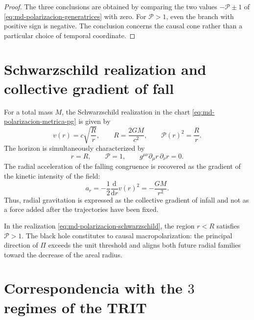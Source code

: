 \begin{proof}
The three conclusions are obtained by comparing the two values
\(-\mathcal P\pm1\) of \eqref{eq:md-polarizacion-generatrices} with zero. For
\(\mathcal P>1\), even the branch with positive sign is negative. The
conclusion concerns the causal cone rather than a particular choice of
temporal coordinate.
\end{proof}

\section{Schwarzschild realization and collective gradient of fall}
\label{sec:md-polarizacion-schwarzschild}

For a total mass \(M\), the Schwarzschild realization in the chart
\eqref{eq:md-polarizacion-metrica-pg} is given by
\begin{equation}
 v(r)=c\sqrt{\frac{R}{r}},
 \qquad
 R=\frac{2GM}{c^2},
 \qquad
 \mathcal P(r)^2=\frac{R}{r}.
 \label{eq:md-polarizacion-schwarzschild}
\end{equation}
The horizon is simultaneously characterized by
\begin{equation}
 r=R,
 \qquad
 \mathcal P=1,
 \qquad
 g^{\mu\nu}\partial_\mu r\,\partial_\nu r=0.
 \label{eq:md-polarizacion-horizonte}
\end{equation}
The radial acceleration of the falling congruence is recovered as the gradient
of the kinetic intensity of the field:
\begin{equation}
 a_r=-\frac12\frac{\mathrm d}{\mathrm dr}v(r)^2
 =-\frac{GM}{r^2}.
 \label{eq:md-polarizacion-gradiente}
\end{equation}
Thus, radial gravitation is expressed as the collective gradient of infall and
not as a force added after the trajectories have been fixed.

\begin{corollary}
\label{cor:md-macropolarizacion-interior}
In the realization \eqref{eq:md-polarizacion-schwarzschild}, the region
\(r<R\) satisfies \(\mathcal P>1\). The black hole constitutes to
causal macropolarization: the principal direction of \(\Pi\) exceeds the
unit threshold and aligns both future radial families toward the decrease of the
areal radius.
\end{corollary}

\section{Correspondencia with the \texorpdfstring{\(3\)}{3} regimes of the TRIT}
\label{sec:md-polarizacion-trit}

